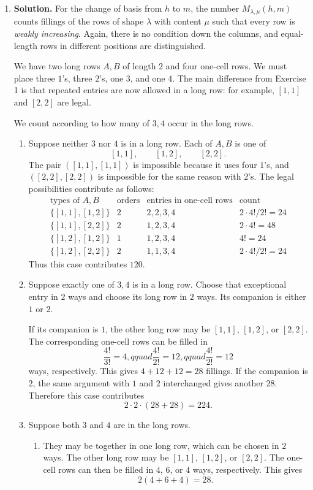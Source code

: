 \documentclass{article}
\begin{document}
\begin{enumerate}
\item \textbf{Solution.}
For the change of basis from $h$ to $m$, the number
$M_{\lambda,\mu}(h,m)$ counts fillings of the rows of shape $\lambda$
with content $\mu$ such that every row is \emph{weakly increasing}.
Again, there is no condition down the columns, and equal-length rows in
different positions are distinguished.

We have two long rows $A,B$ of length $2$ and four one-cell rows.  We
must place three $1$'s, three $2$'s, one $3$, and one $4$.  The main
difference from Exercise 1 is that repeated entries are now allowed in
a long row: for example, $[1,1]$ and $[2,2]$ are legal.

We count according to how many of $3,4$ occur in the long rows.

\begin{enumerate}
\item Suppose neither $3$ nor $4$ is in a long row.  Each of $A,B$ is
one of
\[
[1,1],\qquad [1,2],\qquad [2,2].
\]
The pair $([1,1],[1,1])$ is impossible because it uses four $1$'s,
and $([2,2],[2,2])$ is impossible for the same reason with $2$'s.
The legal possibilities contribute as follows:
\[
\begin{array}{c|c|c|c}
\text{types of }A,B&\text{orders}&\text{entries in one-cell rows}
&\text{count}\\ \hline
\{[1,1],[1,2]\}&2&2,2,3,4&2\cdot 4!/2!=24\\
\{[1,1],[2,2]\}&2&1,2,3,4&2\cdot 4!=48\\
\{[1,2],[1,2]\}&1&1,2,3,4&4!=24\\
\{[1,2],[2,2]\}&2&1,1,3,4&2\cdot 4!/2!=24
\end{array}
\]
Thus this case contributes $120$.

\item Suppose exactly one of $3,4$ is in a long row.  Choose that
exceptional entry in $2$ ways and choose its long row in $2$ ways.
Its companion is either $1$ or $2$.

If its companion is $1$, the other long row may be $[1,1]$, $[1,2]$,
or $[2,2]$.  The corresponding one-cell rows can be filled in
\[
\frac{4!}{3!}=4,qquad
\frac{4!}{2!}=12,qquad
\frac{4!}{2!}=12
\]
ways, respectively.  This gives $4+12+12=28$ fillings.  If the
companion is $2$, the same argument with $1$ and $2$ interchanged gives
another $28$.  Therefore this case contributes
\[
2\cdot2\cdot(28+28)=224.
\]

\item Suppose both $3$ and $4$ are in the long rows.
\begin{enumerate}
\item They may be together in one long row, which can be chosen in
$2$ ways.  The other long row may be $[1,1]$, $[1,2]$, or $[2,2]$.
The one-cell rows can then be filled in $4$, $6$, or $4$ ways,
respectively.  This gives
\[
2(4+6+4)=28.
\]


\end{enumerate}
\end{enumerate}
\end{enumerate}
\end{document}
